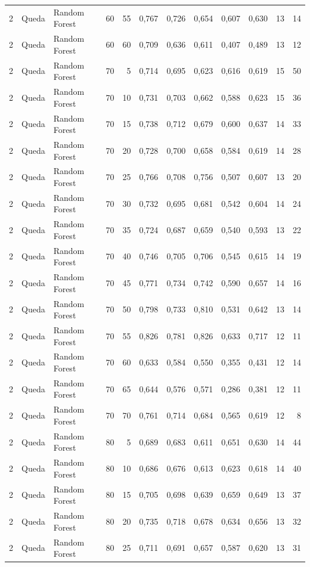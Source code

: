 \begin{longtable}{@{}rllrrrrrrrrr@{}}
2 & Queda & Random Forest & 60 & 55 & 0,767 & 0,726 & 0,654 & 0,607 & 0,630 & 13 & 14 \\
2 & Queda & Random Forest & 60 & 60 & 0,709 & 0,636 & 0,611 & 0,407 & 0,489 & 13 & 12 \\
2 & Queda & Random Forest & 70 & 5 & 0,714 & 0,695 & 0,623 & 0,616 & 0,619 & 15 & 50 \\
2 & Queda & Random Forest & 70 & 10 & 0,731 & 0,703 & 0,662 & 0,588 & 0,623 & 15 & 36 \\
2 & Queda & Random Forest & 70 & 15 & 0,738 & 0,712 & 0,679 & 0,600 & 0,637 & 14 & 33 \\
2 & Queda & Random Forest & 70 & 20 & 0,728 & 0,700 & 0,658 & 0,584 & 0,619 & 14 & 28 \\
2 & Queda & Random Forest & 70 & 25 & 0,766 & 0,708 & 0,756 & 0,507 & 0,607 & 13 & 20 \\
2 & Queda & Random Forest & 70 & 30 & 0,732 & 0,695 & 0,681 & 0,542 & 0,604 & 14 & 24 \\
2 & Queda & Random Forest & 70 & 35 & 0,724 & 0,687 & 0,659 & 0,540 & 0,593 & 13 & 22 \\
2 & Queda & Random Forest & 70 & 40 & 0,746 & 0,705 & 0,706 & 0,545 & 0,615 & 14 & 19 \\
2 & Queda & Random Forest & 70 & 45 & 0,771 & 0,734 & 0,742 & 0,590 & 0,657 & 14 & 16 \\
2 & Queda & Random Forest & 70 & 50 & 0,798 & 0,733 & 0,810 & 0,531 & 0,642 & 13 & 14 \\
2 & Queda & Random Forest & 70 & 55 & 0,826 & 0,781 & 0,826 & 0,633 & 0,717 & 12 & 11 \\
2 & Queda & Random Forest & 70 & 60 & 0,633 & 0,584 & 0,550 & 0,355 & 0,431 & 12 & 14 \\
2 & Queda & Random Forest & 70 & 65 & 0,644 & 0,576 & 0,571 & 0,286 & 0,381 & 12 & 11 \\
2 & Queda & Random Forest & 70 & 70 & 0,761 & 0,714 & 0,684 & 0,565 & 0,619 & 12 & 8 \\
2 & Queda & Random Forest & 80 & 5 & 0,689 & 0,683 & 0,611 & 0,651 & 0,630 & 14 & 44 \\
2 & Queda & Random Forest & 80 & 10 & 0,686 & 0,676 & 0,613 & 0,623 & 0,618 & 14 & 40 \\
2 & Queda & Random Forest & 80 & 15 & 0,705 & 0,698 & 0,639 & 0,659 & 0,649 & 13 & 37 \\
2 & Queda & Random Forest & 80 & 20 & 0,735 & 0,718 & 0,678 & 0,634 & 0,656 & 13 & 32 \\
2 & Queda & Random Forest & 80 & 25 & 0,711 & 0,691 & 0,657 & 0,587 & 0,620 & 13 & 31 \\

\end{longtable}
